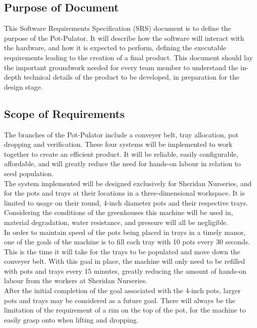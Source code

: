 \documentclass[12pt]{article}
\begin{document}
\subsection{Purpose of Document}

This Software Requirements Specification (SRS) document is to define the purpose of the Pot-Pulator. It will describe how the software will interact with the hardware, and how it is expected to perform, defining the executable requirements leading to the creation of a final product. This document should lay the important groundwork needed for every team member to understand the in-depth technical details of the product to be developed, in preparation for the design stage. 

\subsection{Scope of Requirements} 

The branches of the Pot-Pulator include a conveyer belt, tray allocation, pot dropping and verification. These four systems will be implemented to work together to create an efficient product. It will be reliable, easily configurable, affordable, and will greatly reduce the need for hands-on labour in relation to seed population.  \\

\noindent The system implemented will be designed exclusively for Sheridan Nurseries, and for the pots and trays at their locations in a three-dimensional workspace. It is limited to usage on their round, 4-inch diameter pots and their respective trays. Considering the conditions of the greenhouses this machine will be used in, material degradation, water resistance, and pressure will all be negligible. \\

\noindent In order to maintain speed of the pots being placed in trays in a timely manor, one of the goals of the machine is to fill each tray with 10 pots every 30 seconds. This is the time it will take for the trays to be populated and move down the conveyer belt. With this goal in place, the machine will only need to be refilled with pots and trays every 15 minutes, greatly reducing the amount of hands-on labour from the workers at Sheridan Nurseries. \\

\noindent After the initial completion of the goal associated with the 4-inch pots, larger pots and trays may be considered as a future goal. There will always be the limitation of the requirement of a rim on the top of the pot, for the machine to easily grasp onto when lifting and dropping. \\
\end{document}

